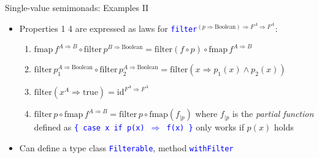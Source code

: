 \documentclass[english]{beamer}
\begin{document}
\begin{frame}{Single-value semimonads: Examples II}

\begin{itemize}
\item Properties 1 \textendash{} 4 are expressed as laws for \texttt{\textcolor{blue}{\footnotesize{}filter}}$^{(p\Rightarrow\text{Boolean})\Rightarrow F^{A}\Rightarrow F^{A}}$:
\begin{enumerate}
\item {\footnotesize{}$\text{fmap}\,f^{A\Rightarrow B}\circ\text{filter}\,p^{B\Rightarrow\text{Boolean}}=\text{filter}\left(f\circ p\right)\circ\text{fmap}\,f^{A\Rightarrow B}$}{\footnotesize \par}
\item {\footnotesize{}$\text{filter}\,p_{1}^{A\Rightarrow\text{Boolean}}\circ\text{filter}\,p_{2}^{A\Rightarrow\text{Boolean}}=\text{filter}\left(x\Rightarrow p_{1}(x)\wedge p_{2}(x)\right)$}{\footnotesize \par}
\item {\footnotesize{}$\text{filter}\left(x^{A}\Rightarrow\text{true}\right)=\text{id}^{F^{A}\Rightarrow F^{A}}$ }{\footnotesize \par}
\item {\footnotesize{}$\text{filter}\,p\circ\text{fmap}\,f^{A\Rightarrow B}=\text{filter}\,p\circ\text{fmap}\left(f_{|p}\right)$
}where {\footnotesize{}$f_{|p}$} is the \emph{partial function} defined
as \texttt{\textcolor{blue}{\footnotesize{}\{ case x if p(x) $\Rightarrow$
f(x) \}}} \textendash{} only works if $p(x)$ holds
\end{enumerate}
\item Can define a type class \texttt{\textcolor{blue}{\footnotesize{}Filterable}},
method \texttt{\textcolor{blue}{\footnotesize{}withFilter}} 
\end{itemize}
\end{frame}
\end{document}
